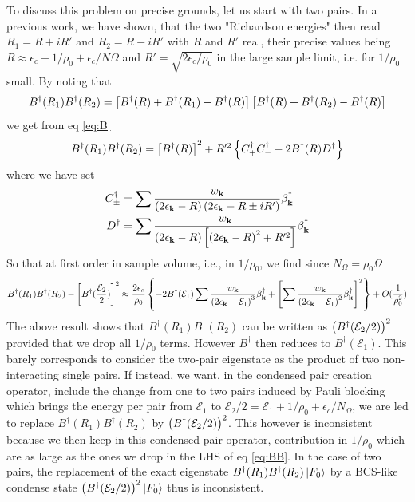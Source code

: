 \documentclass[aps,prb,amsmath,amssymb,preprint,superscriptaddress]{revtex4-1}
\newcommand{\fo}{\ensuremath{\ket{F_0}}}
\renewcommand{\E}{\ensuremath{\mathcal{E}}}
\begin{document}
To discuss this problem on precise grounds, let us start with two pairs.  In a previous work\cite{combescotBCS}, we have shown, that the two "Richardson energies" then read $R_1=R+iR'$ and $R_2=R-i{}R'$ with $R$ and $R'$ real, their precise values being $R\approx\epsilon_c+1/\rho_0+\epsilon_c/N\Omega$ and $R'=\sqrt{2\epsilon_c/\rho_0}$ in the large sample limit, i.e. for $1/\rho_0$ small.  By noting that
\begin{equation}
B^{\dagger}(R_1)B^{\dagger}(R_2)=\left[B^{\dagger}(R)+B^{\dagger}(R_1)-B^{\dagger}(R)\right]\left[B^{\dagger}(R)+B^{\dagger}(R_2)-B^{\dagger}(R)\right]
\end{equation}
we get from eq \eqref{eq:B}
\begin{equation}
B^{\dagger}(R_1)B^{\dagger}(R_2)=\left[B^{\dagger}(R)\right]^2+R'^2\left\{C^{\dagger}_+C^{\dagger}_--2B^{\dagger}(R)D^{\dagger}\right\}
\end{equation}
where we have set 
\begin{align}
C^{\dagger}_{\pm}&=\sum\frac{w_{\mathbf{k}}}{\left(2\epsilon_{\mathbf{k}}-R\right)\left(2\epsilon_{\mathbf{k}}-R\pm{}iR'\right)}\beta^{\dagger}_{\mathbf{k}}\\
D^{\dagger}&=\sum\frac{w_{\mathbf{k}}}{\left(2\epsilon_{\mathbf{k}}-R\right)\left[\left(2\epsilon_{\mathbf{k}}-R\right)^2+{}R'^2\right]}\beta^{\dagger}_{\mathbf{k}}
\end{align}
So that at first order in sample volume, i.e., in $1/\rho_0$, we  find since $N_\Omega=\rho_0\Omega$
\begin{multline}\label{eq:BB}
B^{\dagger}(R_1)B^{\dagger}(R_2)-\mbr{B^{\dagger}(\frac{\E_2}{2})}^2\approx
\frac{2\epsilon_c}{\rho_0}\bbr{-2B^{\dagger}(\E_1)\sum\frac{w_\vk}{\br{2\epsilon_\vk-\E_1}^3}\beta^{\dagger}_\vk
+\mbr{\sum\frac{w_\vk}{\br{2\epsilon_\vk-\E_1}^2}\beta^{\dagger}_\vk}^2}+O(\nth{\rho_0^2})
\end{multline}
The above result shows that $B^{\dagger}(R_1)B^{\dagger}(R_2)$ can be written as $\br{B^{\dagger}(\E_2/2)}^2$ provided that we drop all $1/\rho_0$ terms.  However $B^{\dagger}$ then reduces to $B^{\dagger}(\E_1)$.  This barely corresponds to consider the two-pair eigenstate as the product of two non-interacting single pairs.  If instead, we want, in the condensed pair creation operator, include the change from one to two pairs induced by Pauli blocking which brings the energy per pair from $\E_1$ to $\E_2/2=\E_1+1/\rho_0+\epsilon_c/N_\Omega$, we are led to replace $B^{\dagger}(R_1)B^{\dagger}(R_2)$ by $\br{B^{\dagger}(\E_2/2)}^2$.  This however is inconsistent because we then keep in this condensed pair operator, contribution in $1/\rho_0$ which are as large as the ones we drop in the LHS of eq \eqref{eq:BB}.  In the case of two pairs, the replacement of the exact eigenstate  $B^{\dagger}(R_1)B^{\dagger}(R_2)\fo$ by a BCS-like condense state $\br{B^{\dagger}(\E_2/2)}^2\fo$ thus is inconsistent. 
\end{document}
